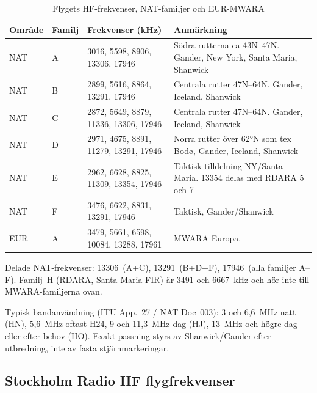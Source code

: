 \begin{table}[H]
\centering
\caption{Flygets HF-frekvenser, NAT-familjer och EUR-MWARA}
\begin{tabular}{@{}lllp{55mm}@{}}
\hline
\textbf{Område} & \textbf{Familj} & \textbf{Frekvenser (kHz)} & \textbf{Anmärkning} \\
\hline
NAT & A
  & 3016, 5598, 8906, 13306, 17946
  & Södra rutterna ca 43N--47N.
    Gander, New York, Santa Maria, Shanwick \\
NAT & B
  & 2899, 5616, 8864, 13291, 17946
  & Centrala rutter 47N--64N.
    Gander, Iceland, Shanwick \\
NAT & C
  & 2872, 5649, 8879, 11336, 13306, 17946
  & Centrala rutter 47N--64N.
    Gander, Iceland, Shanwick \\
NAT & D
  & 2971, 4675, 8891, 11279, 13291, 17946
  & Norra rutter över 62°N som tex
    Bodø, Gander, Iceland, Shanwick \\
NAT & E
  & 2962, 6628, 8825, 11309, 13354, 17946
  & Taktisk tilldelning NY/Santa Maria.
    13354 delas med RDARA 5 och 7 \\
NAT & F
  & 3476, 6622, 8831, 13291, 17946
  & Taktisk, Gander/Shanwick \\
\hline
EUR & A
  & 3479, 5661, 6598, 10084, 13288, 17961
  & MWARA Europa.  \\
\hline
\end{tabular}
\end{table}

Delade NAT-frekvenser: 13306~(A+C), 13291~(B+D+F), 17946~(alla familjer A--F).
Familj~H (RDARA, Santa Maria FIR) är 3491 och 6667~kHz och hör inte till MWARA-familjerna ovan.

Typisk bandanvändning (ITU App.~27 / NAT Doc~003):
3 och 6,6~MHz natt (HN), 5,6~MHz oftast H24, 9 och 11,3~MHz dag (HJ),
13~MHz och högre dag eller efter behov (HO).
Exakt passning styrs av Shanwick/Gander efter utbredning, inte av fasta stjärnmarkeringar.


\subsection{Stockholm Radio HF flygfrekvenser}

